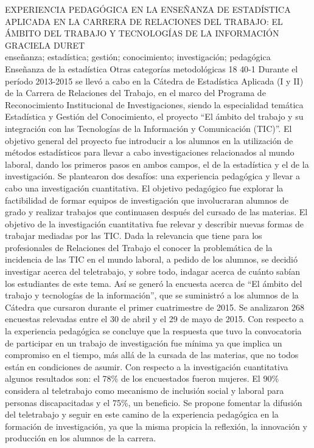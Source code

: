 \A
{EXPERIENCIA PEDAGÓGICA EN LA ENSEÑANZA DE ESTADÍSTICA APLICADA EN LA CARRERA DE RELACIONES DEL TRABAJO: EL ÁMBITO DEL TRABAJO Y TECNOLOGÍAS DE LA INFORMACIÓN}
{GRACIELA DURET}
{
\\
}
{enseñanza; estadística; gestión; conocimiento; investigación; pedagógica} 
 {Enseñanza de la estadística} 
 {Otras categorías metodológicas} 
 {18} 
 {40-1}
{Durante el período 2013-2015 se llevó a cabo en la Cátedra de Estadística Aplicada (I y II) de la Carrera de Relaciones del Trabajo, en el marco del Programa de Reconocimiento Institucional de Investigaciones, siendo la especialidad temática Estadística y Gestión del Conocimiento, el proyecto “El ámbito del trabajo y su integración con las Tecnologías de la Información y Comunicación (TIC)”. El objetivo general del proyecto fue introducir a los alumnos en la utilización de métodos estadísticos para llevar a cabo investigaciones relacionados al mundo laboral, dando los primeros pasos en ambos campos, el de la estadística y el de la investigación. Se plantearon dos desafíos: una experiencia pedagógica y llevar a cabo una investigación cuantitativa. El objetivo pedagógico fue explorar la factibilidad de formar equipos de investigación que involucraran alumnos de grado y realizar trabajos que continuasen después del cursado de las materias. El objetivo de la investigación cuantitativa fue relevar y describir nuevas formas de trabajar mediadas por las TIC. Dada la relevancia que tiene para los profesionales de Relaciones del Trabajo el conocer la problemática de la incidencia de las TIC en el mundo laboral, a pedido de los alumnos, se decidió investigar acerca del teletrabajo, y sobre todo, indagar acerca de cuánto sabían los estudiantes de este tema. Así se generó la encuesta acerca de “El ámbito del trabajo y tecnologías de la información”, que se suministró a los alumnos de la Cátedra que cursaron durante el primer cuatrimestre de 2015. Se analizaron 268 encuestas relevadas entre el 30 de abril y el 29 de mayo de 2015. Con respecto a la experiencia pedagógica se concluye que la respuesta que tuvo la convocatoria de participar en un trabajo de investigación fue mínima ya que implica un compromiso en el tiempo, más allá de la cursada de las materias, que no todos están en condiciones de asumir. Con respecto a la investigación cuantitativa algunos resultados son: el 78\% de los encuestados fueron mujeres. El 90\% considera al teletrabajo como mecanismo de inclusión social y laboral para personas discapacitadas y el 75\%, un beneficio. Se propone fomentar la difusión del teletrabajo y seguir en este camino de la experiencia pedagógica en la formación de investigación, ya que la misma propicia la reflexión, la innovación y producción en los alumnos de la carrera. }
